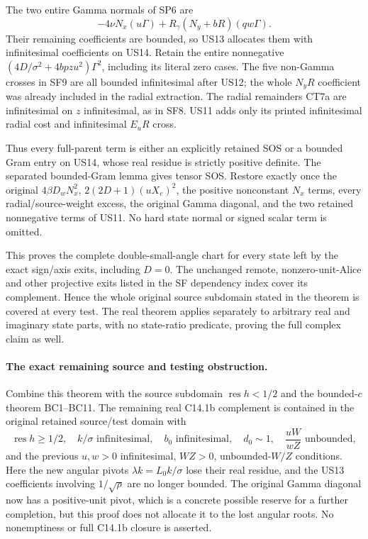 The two entire Gamma normals of SP6 are
\[
       -4\nu N_x(u\Gamma)
            +R_\gamma(N_y+bR)(qw\Gamma).
\]
Their remaining coefficients are bounded, so US13 allocates them
with infinitesimal coefficients on US14. Retain the entire
nonnegative $(4D/\sigma^2+4bpzu^2)\Gamma^2$, including its literal
zero cases. The five non-Gamma crosses in SF9 are all bounded
infinitesimal after US12; the whole $N_yR$ coefficient was already
included in the radial extraction. The radial remainders CT7a are
infinitesimal on $z$ infinitesimal, as in SF8. US11 adds only its
printed infinitesimal radial cost and infinitesimal $E_uR$ cross.

Thus every full-parent term is either an explicitly retained SOS
or a bounded Gram entry on US14, whose real residue is strictly
positive definite. The separated bounded-Gram lemma gives tensor
SOS. Restore exactly once the original $4\beta D_wN_x^2$,
$2(2D+1)(uX_e)^2$, the positive nonconstant $N_x$ terms, every
radial/source-weight excess, the original Gamma diagonal, and the
two retained nonnegative terms of US11. No hard state normal or
signed scalar term is omitted.

This proves the complete double-small-angle chart for every state
left by the exact sign/axis exits, including $D=0$. The unchanged
remote, nonzero-unit-Alice and other projective exits listed in the
SF dependency index cover its complement. Hence the whole original
source subdomain stated in the theorem is covered at every test.
The real theorem applies separately to arbitrary real and imaginary
state parts, with no state-ratio predicate, proving the full complex
claim as well.

\paragraph{The exact remaining source and testing obstruction.}
Combine this theorem with the source subdomain
$\operatorname{res}h<1/2$ and the bounded-$c$ theorem BC1--BC11.
The remaining real C14.1b complement is contained in the original
retained source/test domain with
\[
 \operatorname{res}h\ge1/2,\quad k/\sigma\text{ infinitesimal},
 \quad b_0\text{ infinitesimal},\quad d_0\sim1,
 \quad \frac{uW}{wZ}\text{ unbounded},
 \tag{US15}
\]
and the previous $u,w>0$ infinitesimal, $WZ>0$, unbounded-$W/Z$
conditions. Here the new angular pivots $\lambda k=L_0k/\sigma$
lose their real residue, and the US13 coefficients involving
$1/\sqrt\rho$ are no longer bounded. The original Gamma diagonal
now has a positive-unit pivot, which is a concrete possible reserve
for a further completion, but this proof does not allocate it to
the lost angular roots. No nonemptiness or full C14.1b closure is
asserted.

